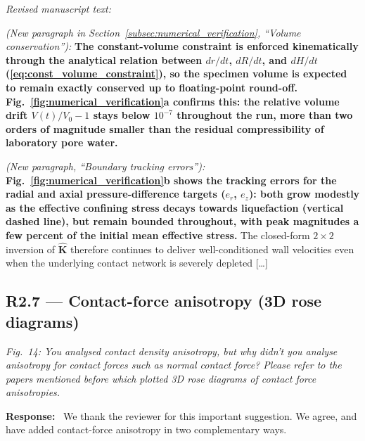 \documentclass[11pt,a4paper]{article}
\newenvironment{rcomment}
  {\begin{leftbar}\color{black!75}\itshape}
  {\end{leftbar}\vspace{0.3em}}
\newcommand{\response}{\par\noindent\textbf{Response:}\ \ignorespaces}
\newenvironment{revtext}
  {\par\vspace{0.2em}\noindent\textit{Revised manuscript text:}\par
   \begingroup\color{black}\begin{leftbar}\small}
  {\end{leftbar}\endgroup\vspace{0.3em}}
\begin{document}
\begin{revtext}
\textit{(New paragraph in
Section~\ref{subsec:numerical_verification}, ``Volume
conservation''):} \textbf{The constant-volume constraint is enforced
kinematically through the analytical relation between $dr/dt$,
$dR/dt$, and $dH/dt$ (\cref{eq:const_volume_constraint}), so the
specimen volume is expected to remain exactly conserved up to
floating-point round-off. Fig.~\ref{fig:numerical_verification}a
confirms this: the relative volume drift $V(t)/V_0 - 1$ stays below
$10^{-7}$ throughout the run, more than two orders of magnitude
smaller than the residual compressibility of laboratory pore
water.}
\medskip

\textit{(New paragraph, ``Boundary tracking errors''):}
\textbf{Fig.~\ref{fig:numerical_verification}b shows the tracking
errors for the radial and axial pressure-difference targets
($e_r$, $e_z$): both grow modestly as the effective confining stress
decays towards liquefaction (vertical dashed line), but remain
bounded throughout, with peak magnitudes a few percent of the
initial mean effective stress.} The closed-form $2 \times 2$
inversion of $\hat{\mathbf{K}}$ therefore continues to deliver
well-conditioned wall velocities even when the underlying contact
network is severely depleted [\ldots]
\end{revtext}

\subsection*{R2.7 --- Contact-force anisotropy (3D rose diagrams)}

\begin{rcomment}
Fig.~14: You analysed contact density anisotropy, but why didn't you analyse
anisotropy for contact forces such as normal contact force? Please refer to
the papers mentioned before which plotted 3D rose diagrams of contact force
anisotropies.
\end{rcomment}

\response
We thank the reviewer for this important suggestion. We agree, and
have added contact-force anisotropy in two
complementary ways.
\end{document}
